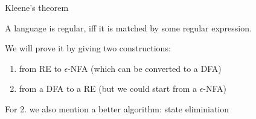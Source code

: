 \documentclass[handout]{beamer}
\begin{document}
\begin{frame}{Kleene's theorem}

    \begin{theorem}
        A language is regular, iff it is matched by some regular expression.
    \end{theorem}

    We will prove it by giving two constructions:
    \begin{enumerate}
        \item from RE to $\epsilon$-NFA (which can be converted to a DFA)
		\item from a DFA to a RE (but we could start from a $\epsilon$-NFA)
	\end{enumerate}
    For 2. we also mention a better algorithm: \alert{state eliminiation}

\end{frame}
\end{document}
